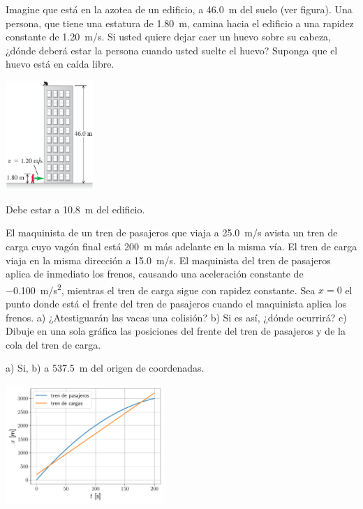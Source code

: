 \documentclass[11pt]{article}
\begin{document}
\begin{exercise}
\begin{multicols}{2}
        Imagine que está en la azotea de un edificio, a \qty{46.0}{m} del suelo (ver figura). Una persona, que tiene una estatura de \qty{1.80}{m}, camina hacia el edificio a una rapidez constante de \qty{1.20}{m/s}. Si usted quiere dejar caer un huevo sobre su cabeza, ¿dónde deberá estar la persona cuando usted suelte el huevo? Suponga que el huevo está en caída libre.
\begin{center}
    \includegraphics[width=0.25\textwidth]{figs/activ-13.png}
\end{center}
\end{multicols}
\end{exercise}
\begin{solution}
    Debe estar a \qty{10.8}{m} del edificio.
\end{solution}

\begin{exercise}
    El maquinista de un tren de pasajeros que viaja a \qty{25.0}{m/s} avista un tren de carga cuyo  vagón final está \qty{200}{m} más adelante en la misma vía. El tren de carga viaja en la misma dirección a \qty{15.0}{m/s}. El maquinista del tren de pasajeros aplica de inmediato los frenos, causando una aceleración constante de \qty{-0.100}{m/s^2}, mientras el tren de carga sigue con rapidez constante. Sea $x = 0$ el punto donde está el frente del tren de pasajeros cuando el maquinista aplica los frenos. a) ¿Atestiguarán las vacas una colisión? b) Si es así, ¿dónde ocurrirá? c) Dibuje en una sola gráfica las posiciones del frente del tren de pasajeros y de la cola del tren de carga.
\end{exercise}
\begin{solution}
    \begin{multicols}{2}
    a) Si, b) a \qty{537.5}{m} del origen de coordenadas.
\begin{center}
    \includegraphics[width=0.45\textwidth]{figs/ac-13.pdf}
\end{center}
\end{multicols}
\end{solution}
\end{document}
